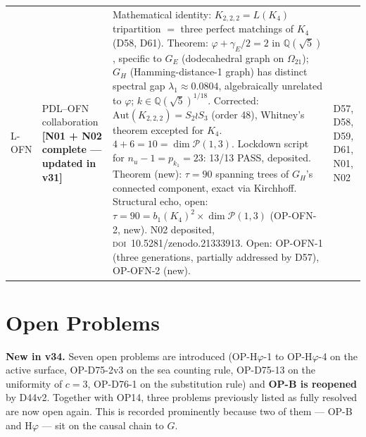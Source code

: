 \documentclass[11pt,a4paper]{article}
\theoremstyle{plain}
\theoremstyle{definition}
\theoremstyle{remark}
\begin{document}
\begin{longtable}{L{0.6cm}L{3.0cm}L{5.5cm}L{4.0cm}}
L-OFN & PDL--OFN collaboration \textbf{[N01 + N02 complete --- updated in v31]} & \textcolor{proofblue}{Mathematical identity}: $K_{2,2,2}=L(K_4)$ tripartition $=$ three perfect matchings of $K_4$ (D58, D61). \textcolor{proofblue}{Theorem}: $\varphi+\gamma_E/2=2$ in $\mathbb{Q}(\sqrt{5})$, specific to $G_E$ (dodecahedral graph on $\Omega_{21}$); $G_H$ (Hamming-distance-1 graph) has distinct spectral gap $\lambda_1\approx0.0804$, algebraically unrelated to $\varphi$; $k\in\mathbb{Q}(\sqrt{5})^{1/18}$. \textcolor{proofblue}{Corrected}: $\mathrm{Aut}(K_{2,2,2})=S_2\wr S_3$ (order 48), Whitney's theorem excepted for $K_4$. $4+6=10=\dim\mathcal{P}(1,3)$. Lockdown script for $n_u-1=p_{k_1}=23$: 13/13 PASS, deposited. \textcolor{proofblue}{Theorem} (new): $\tau=90$ spanning trees of $G_H$'s connected component, exact via Kirchhoff. \textcolor{openproblemred}{Structural echo, open}: $\tau=90=b_1(K_4)^2\times\dim\mathcal P(1,3)$ (OP-OFN-2, new). N02 deposited, \textsc{doi}~10.5281/zenodo.21333913. Open: OP-OFN-1 (three generations, partially addressed by D57), OP-OFN-2 (new). & D57, D58, D59, D61, N01, N02\\[0.3em]
\end{longtable}

\section{Open Problems}
\label{sec:openproblems}

\textcolor{negativered}{\textbf{New in v34.}} Seven open problems are introduced (OP-H$\varphi$-1 to OP-H$\varphi$-4 on the active surface, OP-D75-2v3 on the sea counting rule, OP-D75-13 on the uniformity of $c=3$, OP-D76-1 on the substitution rule) and \textbf{OP-B is reopened} by D44v2. Together with OP14, three problems previously listed as fully resolved are now open again. This is recorded prominently because two of them --- OP-B and H$\varphi$ --- sit on the causal chain to $G$.
\end{document}
